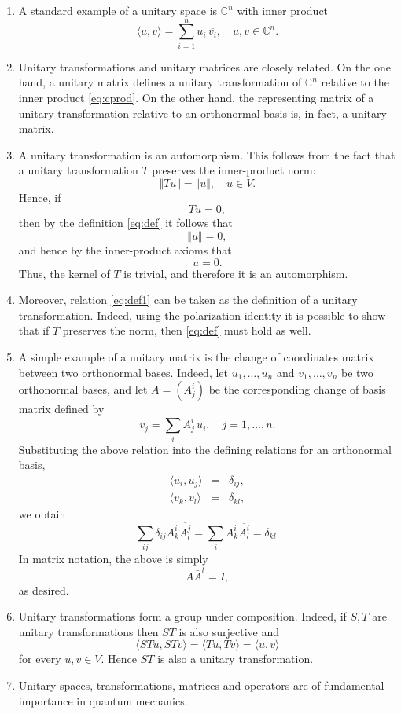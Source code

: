\documentclass[12pt]{article}
\newcommand{\cnums}{\mathbb{C}}
\begin{document}
\begin{enumerate}
\item 

A standard example of a unitary space is
$\cnums^n$ with inner product
\begin{equation}
  \label{eq:cprod}
  \langle u,v \rangle = \sum_{i=1}^n u_i\, \overline{v_i},\quad
  u,v \in\cnums^n.  
\end{equation}


\item Unitary transformations and unitary matrices
are closely related.  On the one hand, a unitary matrix defines a
unitary transformation of $\cnums^n$ relative to the inner product
\eqref{eq:cprod}.  On the other hand, the representing matrix of a
unitary transformation relative to an orthonormal basis is, in fact, a
unitary matrix.

\item A unitary transformation is an automorphism.  This follows from
  the fact that a unitary transformation $T$ preserves the
  inner-product norm:
  \begin{equation}
    \label{eq:def1}
    \Vert T u \Vert= \Vert u\Vert,\quad u\in V.    
  \end{equation}
  Hence, if $$Tu=0,$$
  then by  the definition \eqref{eq:def}
  it follows that  
  $$\Vert u \Vert = 0,$$
  and hence by the inner-product axioms that 
  $$u=0.$$
  Thus, the kernel of $T$ is trivial, and therefore it is an
  automorphism.
\item Moreover, relation \eqref{eq:def1} can be taken as the definition
  of a unitary transformation.  Indeed, using the polarization
  identity it is possible to show that if
  $T$ preserves the norm, then \eqref{eq:def} must hold as well.


\item A simple example of a unitary matrix is the change of
  coordinates matrix between two orthonormal bases.  Indeed, let
  $u_1,\ldots, u_n$ and $v_1,\ldots,v_n$ be two orthonormal bases, and
  let $A=(A^i_j)$ be the corresponding change of basis matrix
  defined by
$$v_j = \sum_i A^i_j\, u_i,\quad j=1,\ldots, n.$$
Substituting the above relation into the defining relations for an
orthonormal basis,
\begin{eqnarray*}
\langle u_i,u_j\rangle &=& \delta_{ij},\\
\langle v_k,v_l\rangle &=& \delta_{kl},  
\end{eqnarray*}
we obtain
$$\sum_{ij} \delta_{ij} A^i_k \overline{A^j_l}  = \sum_i A^i_k \overline{A^i_l} =
\delta_{kl}.$$
In matrix notation, the above is simply
$$A \bar{A}^t = I,$$
as desired.
\item Unitary transformations form a group under composition. Indeed, if $S, T$ are unitary transformations then $ST$ is also surjective and
\begin{displaymath}
\langle STu, STv \rangle = \langle Tu, Tv\rangle = \langle u, v\rangle
\end{displaymath}
for every $u,v \in V$. Hence $ST$ is also a unitary transformation.
\item Unitary spaces, transformations, matrices and operators are of fundamental
  importance in quantum mechanics.
\end{enumerate}
\end{document}
